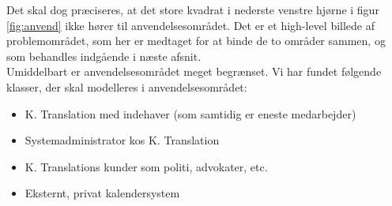 \documentclass[12pt]{article}   %
\begin{document}
Det skal dog præciseres, at det store kvadrat i nederste venstre hjørne i figur
\ref{fig:anvend} ikke hører til anvendelsesområdet. Det er et high-level
billede af problemområdet, som her er medtaget for at binde de to områder sammen,
og som behandles indgående i næste afsnit.\\ 
Umiddelbart er anvendelsesområdet meget begrænset. Vi har fundet følgende
klasser, der skal modelleres i anvendelsesområdet:

\begin{itemize}
\item K. Translation med indehaver (som samtidig er eneste medarbejder)
\item Systemadministrator kos K. Translation
\item K. Translations kunder som politi, advokater, etc.
\item Eksternt, privat kalendersystem 
\end{itemize}
\end{document}
